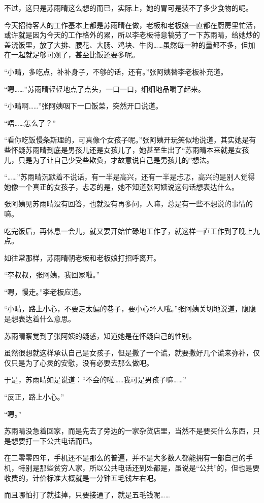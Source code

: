 不过，这只是苏雨晴这么想的而已，实际上，她的胃可是装不了多少食物的呢。

今天招待客人的工作基本上都是苏雨晴在做，老板和老板娘一直都在厨房里忙活，或许就是因为今天的工作格外的累，所以李老板特意犒劳了一下苏雨晴，给她炒的盖浇饭里，放了大排、腰花、大肠、鸡块、牛肉……虽然每一种的量都不多，但加在一起就足够可观了，甚至比饭还要多呢。

“小晴，多吃点，补补身子，不够的话，还有。”张阿姨替李老板补充道。

“嗯……”苏雨晴轻轻地点了点头，一口一口，细细地品嚼了起来。

“小晴啊……”张阿姨咽下一口饭菜，突然开口说道。

“唔……怎么了？”

“看你吃饭慢条斯理的，可真像个女孩子呢。”张阿姨开玩笑似地说道，其实她是有些怀疑苏雨晴到底是男孩儿还是女孩儿了，她甚至生出了“苏雨晴本来就是女孩儿，只是为了让自己少受些欺负，才故意说自己是男孩儿的”想法。

“……”苏雨晴沉默着不说话，有一半是高兴，还有一半是忐忑，高兴的是别人觉得她像一个真正的女孩子，忐忑的是，她不知道张阿姨说这句话想表达什么。

张阿姨见苏雨晴没有回答，也就没有再多问，人嘛，总是有一些不想说的事情的嘛。

吃完饭后，再休息一会儿，就又要开始忙碌地工作了，就这样一直工作到了晚上九点。

如往常那样，苏雨晴朝老板和老板娘打招呼离开。

“李叔叔，张阿姨，我回家啦。”

“嗯，慢走。”李老板应道。

“小晴，路上小心，不要走太偏的巷子，要小心坏人哦。”张阿姨关切地说道，隐隐是想表达着什么意思。

苏雨晴察觉到了张阿姨的疑惑，知道她是在怀疑自己的性别。

虽然很想就这样承认自己是女孩子，但是撒了一个谎，就要撒好几个谎来弥补，仅仅只是为了心灵的安慰，没有必要去那么做吧。

于是，苏雨晴如是说道：“不会的啦……我可是男孩子嘛……”

“反正，路上小心。”

“嗯。”

苏雨晴没急着回家，而是先去了旁边的一家杂货店里，当然不是要买什么东西，只是想要打一下公共电话而已。

在二零零四年，手机还不是那么的普遍，并不是大多数人都能拥有一部自己的手机，特别是那些贫穷人家，所以公共电话还到处都是，虽说是“公共”的，但也是要收费的，计价标准大概就是一分钟五毛钱左右吧。

而且哪怕打了就挂掉，只要接通了，就是五毛钱呢……

